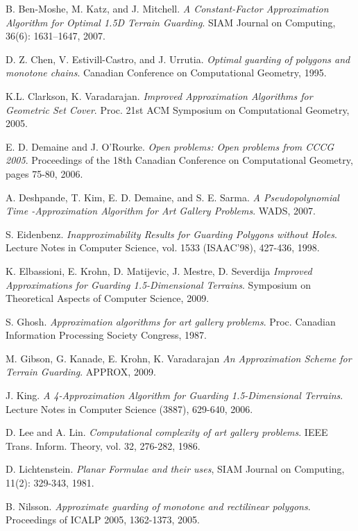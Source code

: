 \documentclass[11pt]{article}
\begin{document}
\begin{thebibliography}{99}
 B. Ben-Moshe, M. Katz, and J. Mitchell. {\em A Constant-Factor Approximation Algorithm for Optimal 1.5D Terrain Guarding}. SIAM Journal on Computing, 36(6): 1631--1647, 2007.

 D. Z. Chen, V. Estivill-Castro, and J. Urrutia. {\em Optimal guarding of polygons and monotone chains}. Canadian Conference on Computational Geometry, 1995.

 K.L. Clarkson, K. Varadarajan. {\em Improved Approximation Algorithms for Geometric Set Cover}. Proc. 21st ACM Symposium on Computational Geometry, 2005.

 E. D. Demaine and J. O’Rourke. {\em Open problems: Open problems from CCCG 2005}. Proceedings of
the 18th Canadian Conference on Computational Geometry, pages 75-80, 2006.

 A. Deshpande, T. Kim, E. D. Demaine, and S. E. Sarma. {\em A Pseudopolynomial Time -Approximation Algorithm for Art Gallery Problems}. WADS, 2007.

 S. Eidenbenz. {\em Inapproximability Results for Guarding Polygons without Holes}. Lecture Notes in Computer Science, vol. 1533 (ISAAC'98), 427-436, 1998.

 K. Elbassioni, E. Krohn, D. Matijevic, J. Mestre, D. Severdija {\em Improved Approximations for Guarding 1.5-Dimensional Terrains}. Symposium on Theoretical Aspects of Computer Science, 2009.

 S. Ghosh. {\em Approximation algorithms for art gallery problems}. Proc. Canadian Information Processing Society Congress, 1987.

 M. Gibson, G. Kanade, E. Krohn, K. Varadarajan {\em  An Approximation Scheme for Terrain Guarding}. APPROX, 2009.

 J. King. {\em A 4-Approximation Algorithm for Guarding 1.5-Dimensional Terrains}. Lecture Notes in Computer Science (3887), 629-640, 2006.

 D. Lee and A. Lin. {\em Computational complexity of art gallery problems}. IEEE Trans. Inform. Theory, vol. 32, 276-282, 1986.

 D. Lichtenstein. {\em Planar Formulae and their uses}, SIAM Journal on Computing, 11(2): 329-343, 1981.

 B. Nilsson. {\em Approximate guarding of monotone and rectilinear polygons}. Proceedings of ICALP 2005, 1362-1373, 2005.

\end{thebibliography}
\end{document}
